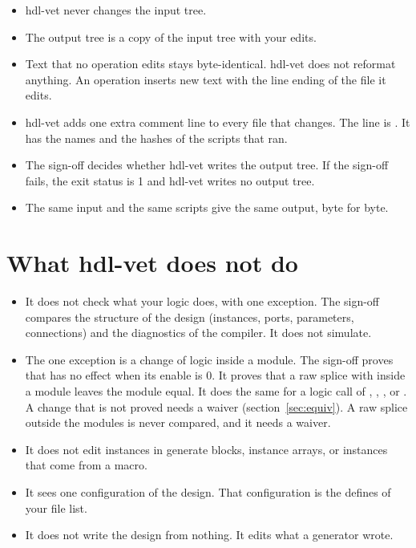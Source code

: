 \begin{itemize}
\item hdl-vet never changes the input tree.
\item The output tree is a copy of the input tree with your edits.
\item Text that no operation edits stays byte-identical. hdl-vet does not
  reformat anything. An operation inserts new text with the line ending of the
  file it edits.
\item hdl-vet adds one extra comment line to every file that changes. The line is
  . It has the names and the hashes
  of the scripts that ran.
\item The sign-off decides whether hdl-vet writes the output tree. If the sign-off
  fails, the exit status is 1 and hdl-vet writes no output tree.
\item The same input and the same scripts give the same output, byte for byte.
\end{itemize}

\section{What hdl-vet does not do}

\begin{itemize}
\item It does not check what your logic does, with one exception. The sign-off compares
  the structure of the design (instances, ports, parameters, connections) and the
  diagnostics of the compiler. It does not simulate.
\item The one exception is a change of logic inside a module. The sign-off proves that
   has no effect when its enable is 0. It proves that a raw
  splice with  inside a module leaves the module equal. It does the same
  for a logic call of , ,
  ,  or
  .
  A change that is not proved needs a waiver (section~\ref{sec:equiv}). A raw splice outside
  the modules is never compared, and it needs a waiver.
\item It does not edit instances in generate blocks, instance arrays, or
  instances that come from a macro.
\item It sees one configuration of the design. That configuration is the defines
  of your file list.
\item It does not write the design from nothing. It edits what a generator
  wrote.
\end{itemize}


